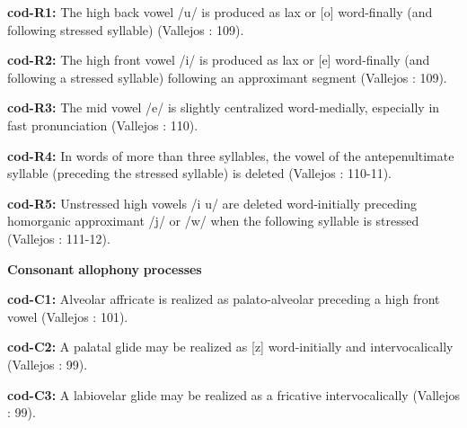 \documentclass[output=paper]{langsci/langscibook}
\begin{document}
\begin{styleBody}
\textbf{cod-R1:} The high back vowel /u/ is produced as lax or [o] word-finally (and following stressed syllable) (Vallejos \citealt{Yopán2010}: 109).
\end{styleBody}

\begin{styleBody}
\textbf{cod-R2:} The high front vowel /i/ is produced as lax or [e] word-finally (and following a stressed syllable) following an approximant segment (Vallejos \citealt{Yopán2010}: 109).
\end{styleBody}

\begin{styleBody}
\textbf{cod-R3:} The mid vowel /e/ is slightly centralized word-medially, especially in fast pronunciation (Vallejos \citealt{Yopán2010}: 110).
\end{styleBody}

\begin{styleBody}
\textbf{cod-R4:} In words of more than three syllables, the vowel of the antepenultimate syllable (preceding the stressed syllable) is deleted (Vallejos \citealt{Yopán2010}: 110-11).
\end{styleBody}

\begin{styleBody}
\textbf{cod-R5:} Unstressed high vowels /i u/ are deleted word-initially preceding homorganic approximant /j/ or /w/ when the following syllable is stressed (Vallejos \citealt{Yopán2010}: 111-12).
\end{styleBody}

\begin{styleBody}
\textbf{Consonant} \textbf{allophony} \textbf{processes}
\end{styleBody}

\begin{styleBody}
\textbf{cod-C1:} Alveolar affricate is realized as palato-alveolar preceding a high front vowel (Vallejos \citealt{Yopán2010}: 101).
\end{styleBody}

\begin{styleBody}
\textbf{cod-C2:} A palatal glide may be realized as [z] word-initially and intervocalically (Vallejos \citealt{Yopán2010}: 99).
\end{styleBody}

\begin{styleBody}
\textbf{cod-C3:} A labiovelar glide may be realized as a fricative intervocalically (Vallejos \citealt{Yopán2010}: 99).
\end{styleBody}
\end{document}
